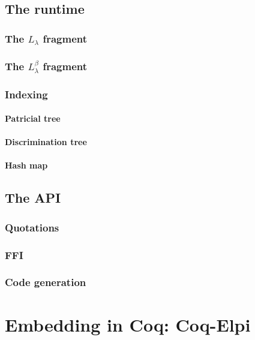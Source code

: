 \documentclass[a4paper, 11pt]{book}
\begin{document}
\section{The runtime}

\cite{dunchev15lpar}

\subsection{The $L_{\lambda}$ fragment}
\subsection{The $L_{\lambda}^{\beta}$ fragment}
\cite{Michaylov1993HigherOrderLP}

\subsection{Indexing}
\subsubsection{Patricial tree}
\subsubsection{Discrimination tree}
\subsubsection{Hash map}

\section{The API}

\subsection{Quotations}
\subsection{FFI}
\subsection{Code generation}

\chapter{Embedding in Coq: Coq-Elpi}
\end{document}
